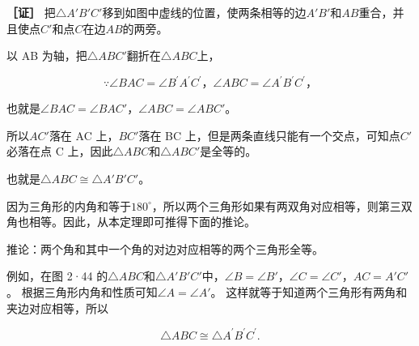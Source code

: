 \textbf{［证］}
把\(\triangle A'B'C'\)移到如图中虚线的位置，使两条相等的边\(A'B'\)和\(AB\)重合，并且使点\(C'\)和点\(C\)在边\(AB\)的两旁。

以 AB 为轴，把\(\triangle ABC'\)翻折在\(\triangle ABC\)上，

\[
\because \angle BAC = \angle B ^{\prime} A ^{\prime} C ^{\prime}\text{，} \angle ABC = \angle A ^{\prime} B ^{\prime} C ^{\prime}\text{，}
\]

也就是\(\angle BAC = \angle BAC'\)，\(\angle ABC = \angle ABC'\)。

所以\(AC'\)落在 AC 上，\(BC'\)落在 BC
上，但是两条直线只能有一个交点，可知点\(C'\)必落在点 C
上，因此\(\triangle ABC\)和\(\triangle ABC'\)是全等的。

也就是\(\triangle ABC \cong \triangle A'B'C'\)。

因为三角形的内角和等于\(180^{\circ}\)，所以两个三角形如果有两双角对应相等，则第三双角也相等。因此，从本定理即可推得下面的推论。

推论：两个角和其中一个角的对边对应相等的两个三角形全等。

例如，在图 2·44
的\(\triangle ABC\)和\(\triangle A'B'C'\)中，\(\angle B = \angle B'\)，\(\angle C = \angle C'\)，\(AC = A'C'\)。
根据三角形内角和性质可知\(\angle A = \angle A'\)。
这样就等于知道两个三角形有两角和夹边对应相等，所以

\[
\triangle ABC \cong \triangle A ^{\prime} B ^{\prime} C ^{\prime}.
\]

